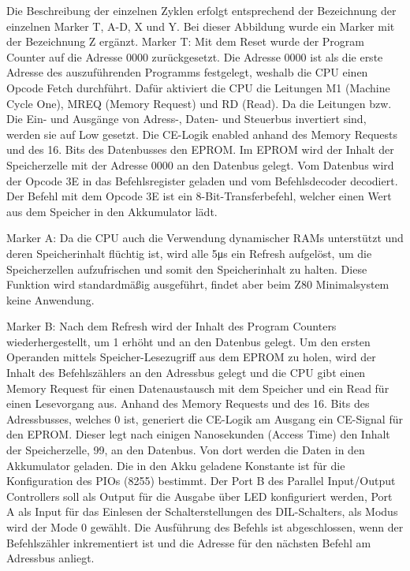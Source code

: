 Die Beschreibung der einzelnen Zyklen erfolgt entsprechend der Bezeichnung der einzelnen Marker T, A-D, X und Y. Bei dieser Abbildung wurde ein Marker mit der Bezeichnung Z ergänzt.
Marker T: Mit dem Reset wurde der Program Counter auf die Adresse 0000 zurückgesetzt. Die Adresse 0000 ist als die erste Adresse des auszuführenden Programms festgelegt, weshalb die CPU einen Opcode Fetch durchführt. Dafür aktiviert die CPU die Leitungen M1 (Machine Cycle One), MREQ (Memory Request) und RD (Read). Da die Leitungen bzw. Die Ein- und Ausgänge von Adress-, Daten- und Steuerbus invertiert sind, werden sie auf Low gesetzt. Die CE-Logik enabled anhand des Memory Requests und des 16. Bits des Datenbusses den EPROM. Im EPROM wird der Inhalt der Speicherzelle mit der Adresse 0000 an den Datenbus gelegt. Vom Datenbus wird der Opcode 3E in das Befehlsregister geladen und vom Befehlsdecoder decodiert. Der Befehl mit dem Opcode 3E ist ein 8-Bit-Transferbefehl, welcher einen Wert aus dem Speicher in den Akkumulator lädt.

Marker A: Da die CPU auch die Verwendung dynamischer RAMs unterstützt und deren Speicherinhalt flüchtig ist, wird alle 5μs ein Refresh aufgelöst, um die Speicherzellen aufzufrischen und somit den Speicherinhalt zu halten. Diese Funktion wird standardmäßig ausgeführt, findet aber beim Z80 Minimalsystem keine Anwendung.

Marker B: Nach dem Refresh wird der Inhalt des Program Counters wiederhergestellt, um 1 erhöht und an den Datenbus gelegt. Um den ersten Operanden mittels Speicher-Lesezugriff aus dem EPROM zu holen, wird der Inhalt des Befehlszählers an den Adressbus gelegt und die CPU gibt einen Memory Request für einen Datenaustausch mit dem Speicher und ein Read für einen Lesevorgang aus. Anhand des Memory Requests und des 16. Bits des Adressbusses, welches 0 ist, generiert die CE-Logik am Ausgang ein CE-Signal für den EPROM. Dieser legt nach einigen Nanosekunden (Access Time) den Inhalt der Speicherzelle, 99, an den Datenbus. Von dort werden die Daten in den Akkumulator geladen. Die in den Akku geladene Konstante ist für die Konfiguration des PIOs (8255) bestimmt. Der Port B des Parallel Input/Output Controllers soll als Output für die Ausgabe über LED konfiguriert werden, Port A als Input für das Einlesen der Schalterstellungen des DIL-Schalters, als Modus wird der Mode 0 gewählt. Die Ausführung des Befehls ist abgeschlossen, wenn der Befehlszähler inkrementiert ist und die Adresse für den nächsten Befehl am Adressbus anliegt.

